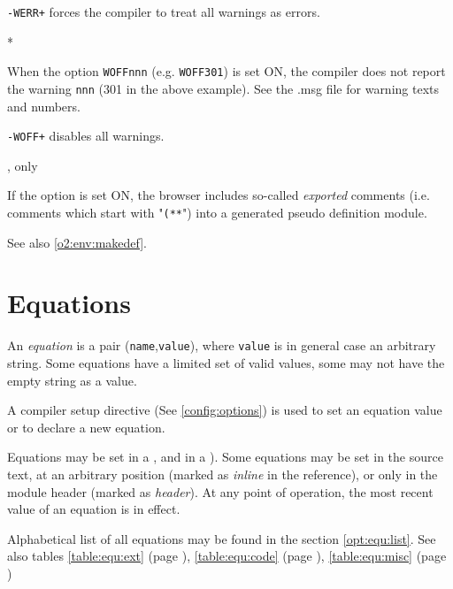 \begin{description}
        \verb'-WERR+' forces the compiler to treat all warnings as errors.

        \MLBegin{}*\MLEnd{}  \inline

        When the option \verb'WOFFnnn' (e.g. \verb'WOFF301') is set ON, the
        compiler does not report the warning \verb'nnn' (301 in the above example).
        See the \XC{}.msg file for warning texts and numbers.

        \verb'-WOFF+' disables all warnings.

        \MLBegin{}\ModeC{},\ot{} only\MLEnd{}

        If the option is set ON, the browser includes so-called
        {\em exported} comments
        (i.e. comments which start with "\verb'(**'")
        into a generated pseudo definition module.

        See also \ref{o2:env:makedef}.

\ifonline \else
\end{description}
\fi

\section{Equations}\label{opt:equ}

An {\em equation} is a pair ({\tt name},{\tt value}), where {\tt value} is
in general case an arbitrary string. Some equations have a limited set of
valid values, some may not have the empty string as a value.

A compiler setup directive (See \ref{config:options}) is used
to set an equation value or to declare a new equation.

Equations may be set in a ,
 and in a ).
Some equations may be set in the source text, at an arbitrary position
(marked as {\em inline} in the reference), or only in the module header
(marked as {\em header}). At any point of operation, the most recent
value of an equation is in effect.

Alphabetical list of all equations may be found in the section \ref{opt:equ:list}.
\ifonline\else
See also tables
\ref{table:equ:ext} (page \pageref{table:equ:ext}),
\ref{table:equ:code} (page \pageref{table:equ:code}),
\ref{table:equ:misc} (page \pageref{table:equ:misc})
\fi

